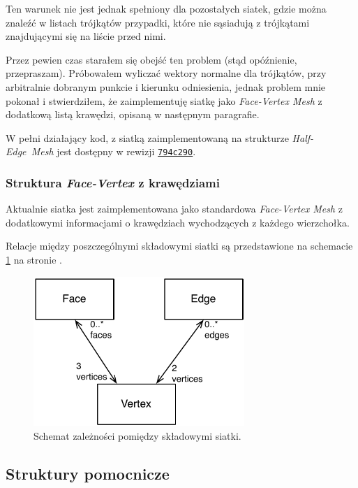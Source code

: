 \documentclass[10pt,a4paper]{article}
\newcommand{\f}[1]{\texttt{#1}}
\begin{document}
Ten warunek nie jest jednak spełniony dla pozostałych siatek, gdzie można
znaleźć w listach trójkątów przypadki, które nie sąsiadują z trójkątami
znajdującymi się na liście przed nimi.

Przez pewien czas starałem się obejść ten problem (stąd opóźnienie,
przepraszam). Próbowałem wyliczać wektory normalne dla trójkątów, przy
arbitralnie dobranym punkcie i kierunku odniesienia, jednak problem mnie
pokonał i stwierdziłem, że zaimplementuję siatkę jako \emph{Face-Vertex Mesh}
z dodatkową listą krawędzi, opisaną w następnym paragrafie.

W pełni działający kod, z siatką zaimplementowaną na strukturze
\emph{Half-Edge~Mesh} jest dostępny w rewizji
\href{https://github.com/student-tomasz/aisd-projekt-indywidualny/tree/794c2908657a891f020920f34f9f9bc6f5fdb39c}{\f{794c290}}.

\subsubsection{Struktura \emph{Face-Vertex} z krawędziami}

Aktualnie siatka jest zaimplementowana jako standardowa \emph{Face-Vertex
Mesh} z dodatkowymi informacjami o krawędziach wychodzących z każdego
wierzchołka.

Relacje między poszczególnymi składowymi siatki są przedstawione na schemacie
\ref{fig:face_vertex_model} na stronie \pageref{fig:face_vertex_model}.

\begin{figure}[p]
  \centering
  \includegraphics[width=8cm]{figury/face-vertex-model}
  \caption{Schemat zależności pomiędzy składowymi siatki.}
  \label{fig:face_vertex_model}
\end{figure}


\subsection{Struktury pomocnicze}
\label{sec:struktury_pomocnicze}
\end{document}
